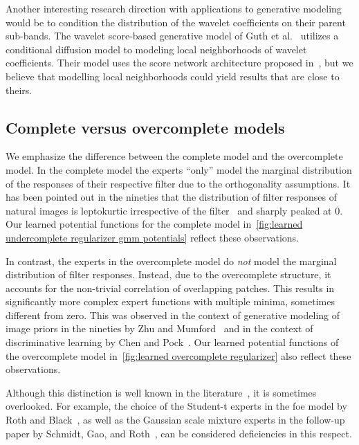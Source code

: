 Another interesting research direction with applications to generative modeling would be to condition the distribution of the wavelet coefficients on their parent sub-bands.
The wavelet score-based generative model of Guth et al.~\cite{guth2022wavelet} utilizes a conditional diffusion model to modeling local neighborhoods of wavelet coefficients.
Their model uses the score network architecture proposed in~\cite{nichol2021improved}, but we believe that modelling local neighborhoods could yield results that are close to theirs.
\subsection{Complete versus overcomplete models}%
\label{ssec:conv v patch}
We emphasize the difference between the complete model and the overcomplete model.
In the complete model the experts \enquote{only} model the marginal distribution of the responses of their respective filter due to the orthogonality assumptions.
It has been pointed out in the nineties that the distribution of filter responses of natural images is leptokurtic irrespective of the filter~\cite{hua_statistics_1999} and sharply peaked at \num{0}.
Our learned potential functions for the complete model in~\cref{fig:learned undercomplete regularizer gmm potentials} reflect these observations.

In contrast, the experts in the overcomplete model do \emph{not} model the marginal distribution of filter responses.
Instead, due to the overcomplete structure, it accounts for the non-trivial correlation of overlapping patches.
This results in significantly more complex expert functions with multiple minima, sometimes different from zero.
This was observed in the context of generative modeling of image priors in the nineties by Zhu and Mumford~\cite{zhu_prior_1997} and in the context of discriminative learning by Chen and Pock~\cite{chen_trainable_2017}.
Our learned potential functions of the overcomplete model in~\cref{fig:learned overcomplete regularizer} also reflect these observations.

Although this distinction is well known in the literature~\cite{chen_trainable_2017,romano_boosting_2017,zhu_filters_1998,zoran_learning_2011}, it is sometimes overlooked.
For example, the choice of the Student-t experts in the \gls{foe} model by Roth and Black~\cite{RoBl09}, as well as the Gaussian scale mixture experts in the follow-up paper by Schmidt, Gao, and Roth~\cite{schmidt_generative_2010}, can be considered deficiencies in this respect.

